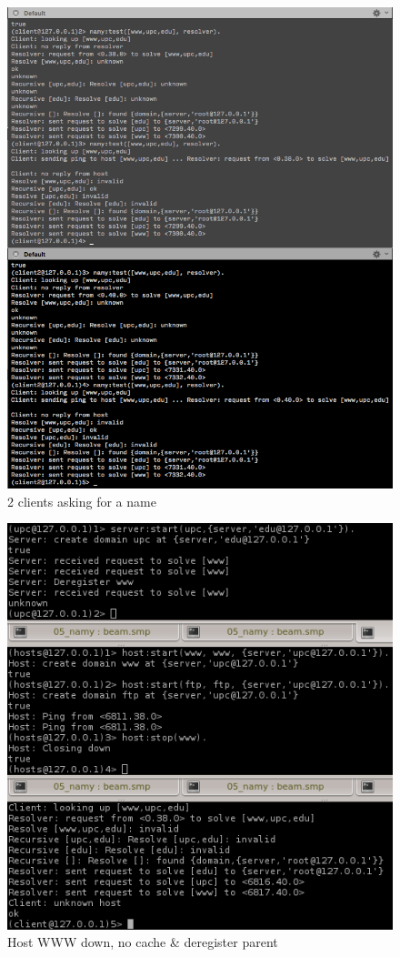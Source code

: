 \begin{figure}[h!]
\centering
\includegraphics[scale=0.6]{resources/img/2clients_askingForName.png}
\caption{2 clients asking for a name}
\end{figure}

\begin{figure}[h!]
\centering
\includegraphics[scale=1]{resources/img/hostWWWdown_NoCache_deregisterParent.png}
\caption{Host WWW down, no cache \& deregister parent}
\end{figure}

